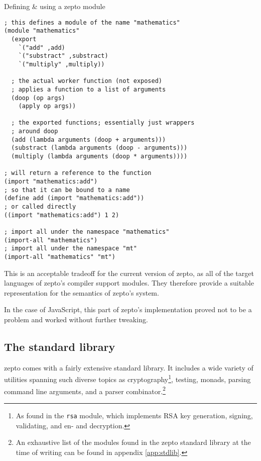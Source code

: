 \documentclass[oneside,11pt,xetex]{scrbook}
\begin{document}
\begin{listing}[H]
\caption{Defining \& using a zepto module}
\begin{verbatim}
; this defines a module of the name "mathematics"
(module "mathematics"
  (export
    `("add" ,add)
    `("substract" ,substract)
    `("multiply" ,multiply))

  ; the actual worker function (not exposed)
  ; applies a function to a list of arguments
  (doop (op args)
    (apply op args))

  ; the exported functions; essentially just wrappers
  ; around doop
  (add (lambda arguments (doop + arguments)))
  (substract (lambda arguments (doop - arguments)))
  (multiply (lambda arguments (doop * arguments))))

; will return a reference to the function
(import "mathematics:add")
; so that it can be bound to a name
(define add (import "mathematics:add"))
; or called directly
((import "mathematics:add") 1 2)

; import all under the namespace "mathematics"
(import-all "mathematics")
; import all under the namespace "mt"
(import-all "mathematics" "mt")
\end{verbatim}
\label{fig:zepmod}
\end{listing}

This is an acceptable tradeoff for the current version of zepto, as all of the
target languages of zepto's compiler support modules. They therefore provide a
suitable representation for the semantics of zepto's system.

In the case of JavaScript, this part of zepto's implementation proved not
to be a problem and worked without further tweaking.

\subsection{The standard library}

zepto comes with a fairly extensive standard library. It includes a wide
variety of utilities spanning such diverse topics as cryptography\footnote{As found
in the \texttt{rsa} module, which implements RSA key generation, signing,
validating, and en- and decryption.}, testing, monads, parsing command line
arguments, and a parser combinator.\footnote{An exhaustive list of the modules
found in the zepto standard library at the time of writing can be found in appendix
\ref{app:stdlib}.}
\end{document}
